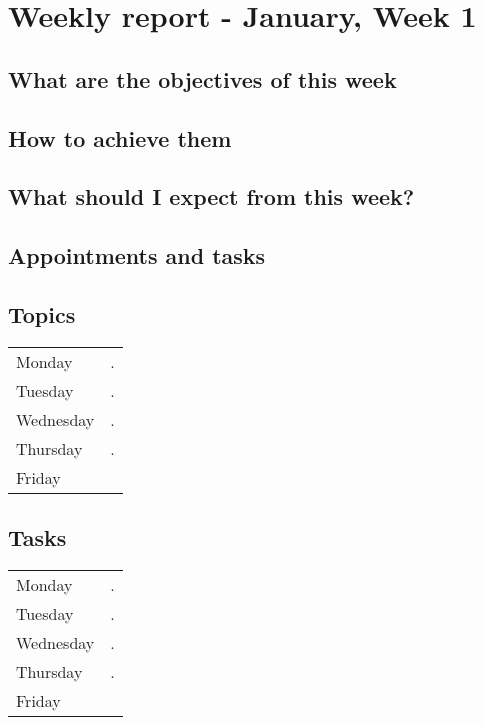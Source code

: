 
\section*{\textbf{Weekly report - January, Week 1}}
\subsection*{What are the objectives of this week}
\subsection*{How to achieve them}
\subsection*{What should I expect from this week?}
\subsection*{Appointments and tasks}
\subsection*{Topics}
	\begin{center}                                                          
	\begin{tabular}{l|p{}} %
	Monday & . \\                                                 
	Tuesday & .\\                                                        
	Wednesday & .\\                                       
	Thursday & . \\       	
	Friday
	\end{tabular}                                                           
        \end{center} 
\subsection*{Tasks}
	\begin{center}                                                          
	\begin{tabular}{l|p{}} %
	Monday & . \\                                                 
	Tuesday & .\\                                                        
	Wednesday & .\\                                       
	Thursday & . \\       	
	Friday
	\end{tabular}                                                           
        \end{center} 
